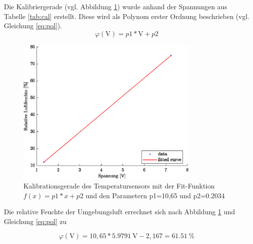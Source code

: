 Die Kalibriergerade (vgl. Abbildung \ref{fig:cal2}) wurde anhand der Spannungen aus Tabelle \ref{tab:cal} erstellt. Diese wird als Polynom erster Ordnung beschrieben (vgl. Gleichung \ref{eq:pol}).
\begin{equation}
	\label{eq:pol}
	\varphi(\text{V}) = p1*\text{V} + p2
\end{equation}

\begin{figure}[H]
	\centering
	\includegraphics[width=0.8\textwidth]{../DATA/Kalibriergerade_Feuchte.eps}
	\caption[Kalibrationsgerade des Temperatursensors]{Kalibrationsgerade des Temperatursensors mit der Fit-Funktion $f(x) = p1*x + p2$ und den Parametern p1=10,65 und p2=0.2034}
	\label{fig:cal2}
\end{figure}

Die relative Feuchte der Umgebungsluft errechnet sich nach Abbildung \ref{fig:cal2} und Gleichung \ref{eq:pol} zu

\begin{equation}
	\label{eq:cal}
	\varphi(\text{V})=10,65*\SI{5,9791}{\volt}-2,167=\SI{61,51}{\percent}
\end{equation}
		

 